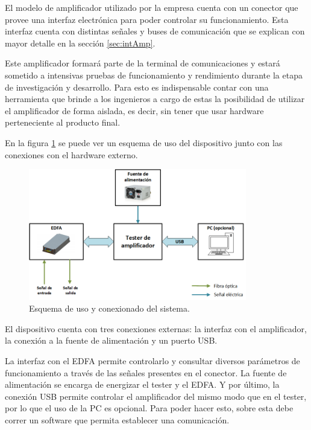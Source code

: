 El modelo de amplificador utilizado por la empresa cuenta con un conector que provee una interfaz electrónica para poder controlar su funcionamiento. Esta interfaz cuenta con distintas señales y buses de comunicación que se explican con mayor detalle en la sección \ref{sec:intAmp}.

Este amplificador formará parte de la terminal de comunicaciones y estará sometido a intensivas pruebas de funcionamiento y rendimiento durante la etapa de investigación y desarrollo. Para esto es indispensable contar con una herramienta que brinde a los ingenieros a cargo de estas la posibilidad de utilizar el amplificador de forma aislada, es decir, sin tener que usar hardware perteneciente al producto final.

En la figura \ref{fig:bloquesProy} se puede ver un esquema de uso del dispositivo junto con las conexiones con el hardware externo.

\begin{figure}[H]
\centering
\includegraphics[width=0.85\textwidth]{./Figures/bloquesProy.png}
\caption{Esquema de uso y conexionado del sistema.}
\label{fig:bloquesProy}
\end{figure}

El dispositivo cuenta con tres conexiones externas: la interfaz con el amplificador, la conexión a la fuente de alimentación y un puerto USB.

La interfaz con el EDFA permite controlarlo y consultar diversos parámetros de funcionamiento a través de las señales presentes en el conector. La fuente de alimentación se encarga de energizar el tester y el EDFA. Y por último, la conexión USB permite controlar el amplificador del mismo modo que en el tester, por lo que el uso de la PC es opcional. Para poder hacer esto, sobre esta debe correr un software que permita establecer una comunicación.


